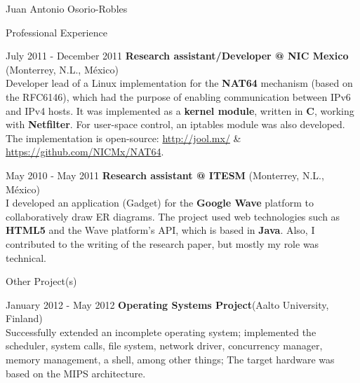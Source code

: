 \documentclass[english,10pt,letterpaper]{article}
\begin{document}
\begin{cv}{Juan Antonio Osorio-Robles}
\begin{cvlist}{Professional Experience}
		\item [July 2011 - December 2011]
            \textbf{Research assistant/Developer @ NIC Mexico} (Monterrey,
            N.L., M\'{e}xico)\\
            Developer lead of a Linux implementation for the \textbf{NAT64}
            mechanism (based on the RFC6146), which had the purpose of
            enabling communication between IPv6 and IPv4 hosts. It was
            implemented as a \textbf{kernel module}, written in \textbf{C},
            working with \textbf{Netfilter}. For user-space control, an
            iptables module was also developed. The implementation is
            open-source:
            \href{http://jool.mx/}{http://jool.mx/} \&\\
            \href{https://github.com/NICMx/NAT64}{https://github.com/NICMx/NAT64}.

		\item [May 2010 - May 2011]
            \textbf{Research assistant @ ITESM} (Monterrey, N.L., M\'{e}xico)\\
            I developed an application (Gadget) for the \textbf{Google Wave}
            platform to collaboratively draw ER diagrams. The project used web
            technologies such as \textbf{HTML5} and the Wave platform's API,
            which is based in \textbf{Java}. Also, I contributed to the
            writing of the research paper, but mostly my role was technical.

	\end{cvlist}

    \begin{cvlist}{Other Project(s)}
		\item [January 2012 - May 2012]
            \textbf{Operating Systems Project}(Aalto University, Finland)\\
            Successfully extended an incomplete operating system; implemented
            the scheduler, system calls, file system, network driver,
            concurrency manager, memory management, a shell, among other
            things; The target hardware was based on the MIPS architecture.
	\end{cvlist}


\end{cv}
\end{document}

